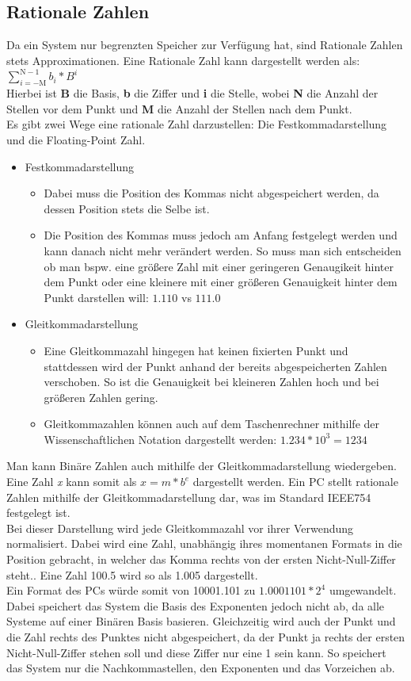\documentclass{article}
\begin{document}
	\subsection{Rationale Zahlen}
		Da ein System nur begrenzten Speicher zur Verfügung hat, sind Rationale Zahlen stets Approximationen. Eine Rationale Zahl kann dargestellt werden als: $\sum_{i=-\mathrm{M}}^{\mathrm{N}-1}b_i*B^i$ \\
		Hierbei ist \textbf{B} die Basis, \textbf{b} die Ziffer und \textbf{i} die Stelle, wobei \textbf{N} die Anzahl der Stellen vor dem Punkt und \textbf{M} die Anzahl der Stellen nach dem Punkt. \\
		Es gibt zwei Wege eine rationale Zahl darzustellen: Die Festkommadarstellung und die Floating-Point Zahl.
		\begin{itemize}
			\item{Festkommadarstellung}
			\begin{itemize}
				\item{Dabei muss die Position des Kommas nicht abgespeichert werden, da dessen Position stets die Selbe ist.}
				\item{Die Position des Kommas muss jedoch am Anfang festgelegt werden und kann danach nicht mehr verändert werden. So muss man sich entscheiden ob man bspw. eine größere Zahl mit einer geringeren Genaugikeit hinter dem Punkt oder eine kleinere mit einer größeren Genauigkeit hinter dem Punkt darstellen will: $1.110$ vs $111.0$}
			\end{itemize}
			\item{Gleitkommadarstellung}
			\begin{itemize}
				\item{Eine Gleitkommazahl hingegen hat keinen fixierten Punkt und stattdessen wird der Punkt anhand der bereits abgespeicherten Zahlen verschoben. So ist die Genauigkeit bei kleineren Zahlen hoch und bei größeren Zahlen gering.}
				\item{Gleitkommazahlen können auch auf dem Taschenrechner mithilfe der Wissenschaftlichen Notation dargestellt werden: $1.234 * 10^{3} = 1234$}
			\end{itemize}
		\end{itemize}
		Man kann Binäre Zahlen auch mithilfe der Gleitkommadarstellung wiedergeben. Eine Zahl \textit{x} kann somit als $x = m*b^e$ dargestellt werden. Ein PC stellt rationale Zahlen mithilfe der Gleitkommadarstellung dar, was im Standard IEEE754 festgelegt ist. \\
		Bei dieser Darstellung wird jede Gleitkommazahl vor ihrer Verwendung normalisiert. Dabei wird eine Zahl, unabhängig ihres momentanen Formats in die Position gebracht, in welcher das Komma rechts von der ersten Nicht-Null-Ziffer steht.. Eine Zahl 100.5 wird so als 1.005 dargestellt. \\
		Ein Format des PCs würde somit von 10001.101 zu $1.0001101*2^4$ umgewandelt. Dabei speichert das System die Basis des Exponenten jedoch nicht ab, da alle Systeme auf einer Binären Basis basieren. Gleichzeitig wird auch der Punkt und die Zahl rechts des Punktes nicht abgespeichert, da der Punkt ja rechts der ersten Nicht-Null-Ziffer stehen soll und diese Ziffer nur eine 1 sein kann. So speichert das System nur die Nachkommastellen, den Exponenten und das Vorzeichen ab. \\
\end{document}

